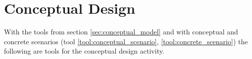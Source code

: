 \section{Conceptual Design} \label{sec:envisionment}
With the tools from section \ref{sec:conceptual_model} and with conceptual and concrete scenarios (tool \ref{tool:conceptual_scenario}, \ref{tool:concrete_scenario}) the following are tools for the conceptual design activity.



